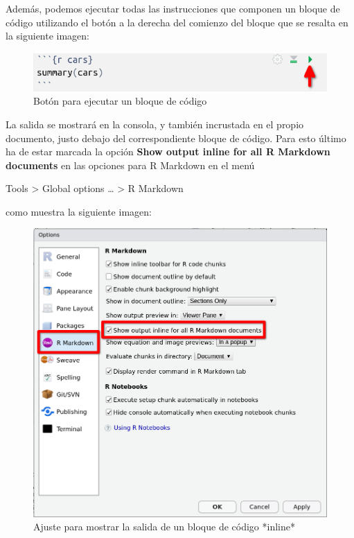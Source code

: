 \documentclass[
  title=normal,
  notoc,
  bib=normal]{mnye}
\begin{document}
Además, podemos ejecutar todas las instrucciones que componen un bloque de código utilizando el botón a la derecha del comienzo del bloque que se resalta en la siguiente imagen:

\begin{figure}

{\centering \includegraphics[width=0.8\linewidth]{images/run} 

}

\caption{Botón para ejecutar un bloque de código}\label{fig:unnamed-chunk-15}
\end{figure}

La salida se mostrará en la consola, y también incrustada en el propio documento, justo debajo del correspondiente bloque de código. Para esto último ha de estar marcada la opción \textbf{Show output inline for all R Markdown documents} en las opciones para R Markdown en el menú

\begin{menu}
Tools \textgreater{} Global options \ldots{} \textgreater{} R Markdown

\end{menu}

como muestra la siguiente imagen:

\begin{figure}

{\centering \includegraphics[width=1\linewidth]{images/options-r-markdown-b} 

}

\caption{Ajuste para mostrar la salida de un bloque de código *inline*}\label{fig:unnamed-chunk-16}
\end{figure}
\end{document}
